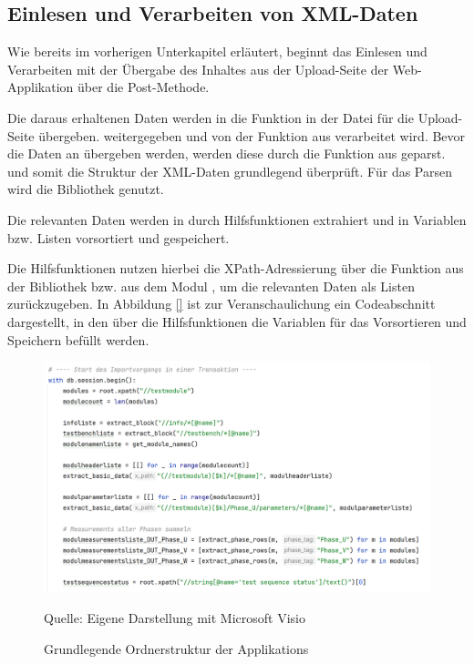 \usepackage{hyperref}\subsection{Einlesen und Verarbeiten von XML-Daten}
\label{subsec:einlesen-und-verarbeiten-von-xml-daten}

Wie bereits im vorherigen Unterkapitel erläutert, beginnt das Einlesen und Verarbeiten mit der Übergabe des Inhaltes aus der
Upload-Seite der Web-Applikation über die Post-Methode.

Die daraus erhaltenen Daten werden in die Funktion  in der Datei  für die Upload-Seite übergeben.
weitergegeben und von der Funktion  aus  verarbeitet wird.
Bevor die Daten an  übergeben werden, werden diese durch die Funktion  aus
 geparst.
und somit die Struktur der XML-Daten grundlegend überprüft.
Für das Parsen wird die Bibliothek  genutzt.

Die relevanten Daten werden in  durch Hilfsfunktionen extrahiert und in Variablen bzw. Listen
vorsortiert und gespeichert.

Die Hilfsfunktionen nutzen hierbei die XPath-Adressierung über die Funktion  aus der Bibliothek 
bzw. aus dem Modul , um die relevanten Daten als Listen zurückzugeben.
In Abbildung \ref{} ist zur Veranschaulichung ein Codeabschnitt dargestellt, in den über die Hilfsfunktionen die Variablen
für das Vorsortieren und Speichern befüllt werden.

\begin{figure}[H]
    \centering
    \includegraphics[width=1\textwidth]{Grafiken/5.3 Listen}
    \caption{Grundlegende Ordnerstruktur der Applikations}
    \label{fig: Grundlegende Ordnerstruktur der Applikations}
    {Quelle: Eigene Darstellung mit Microsoft Visio}
\end{figure}


